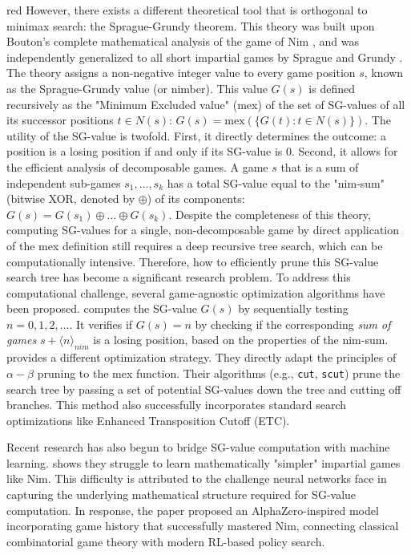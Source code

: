 \documentclass[review]{elsarticle}
\begin{document}
\begin{color}{red}
However, there exists a different theoretical tool that is orthogonal to minimax search: the Sprague-Grundy theorem. 
This theory was built upon Bouton's complete mathematical analysis of the game of Nim \cite{Bou1901}, 
and was independently generalized to all short impartial games by Sprague \cite{sprague1935} and Grundy \cite{grundy1939}. 
The theory assigns a non-negative integer value to every game position $s$, known as the Sprague-Grundy value (or nimber). 
This value $G(s)$ is defined recursively as the "Minimum Excluded value" (mex) of the set of SG-values of all its successor positions $t \in N(s)$: $G(s) = \text{mex}(\{G(t) : t \in N(s)\})$.
The utility of the SG-value is twofold. 
First, it directly determines the outcome: a position is a losing position if and only if its SG-value is 0. 
Second, it allows for the efficient analysis of decomposable games. 
A game $s$ that is a sum of independent sub-games $s_1, \dots, s_k$ has a total SG-value equal to the "nim-sum" (bitwise XOR, denoted by $\oplus$) of its components: $G(s) = G(s_1) \oplus \dots \oplus G(s_k)$. 
Despite the completeness of this theory, computing SG-values for a single, non-decomposable game by direct application of the mex definition still requires a deep recursive tree search, which can be computationally intensive. 
Therefore, how to efficiently prune this SG-value search tree has become a significant research problem. 
To address this computational challenge, several game-agnostic optimization algorithms have been proposed. 
\cite{lemoine2012} computes the SG-value $G(s)$ by sequentially testing $n=0, 1, 2, \dots$. 
It verifies if $G(s) = n$ by checking if the corresponding \textit{sum of games} $s + \langle n \rangle_{nim}$ is a losing position, based on the properties of the nim-sum.
\cite{BelM2020} provides a different optimization strategy. 
They directly adapt the principles of $\alpha-\beta$ pruning to the mex function. 
Their algorithms (e.g., \texttt{cut}, \texttt{scut}) prune the search tree by passing a set of potential SG-values down the tree and cutting off branches. 
This method also successfully incorporates standard search optimizations like Enhanced Transposition Cutoff (ETC).

Recent research has also begun to bridge SG-value computation with machine learning.  
\cite{riis2024} shows they struggle to learn mathematically "simpler" impartial games like Nim. 
This difficulty is attributed to the challenge neural networks face in capturing the underlying mathematical structure required for SG-value computation. 
In response, the paper proposed an AlphaZero-inspired model incorporating game history that successfully mastered Nim, connecting classical combinatorial game theory with modern RL-based policy search.


\end{color}
\end{document}
